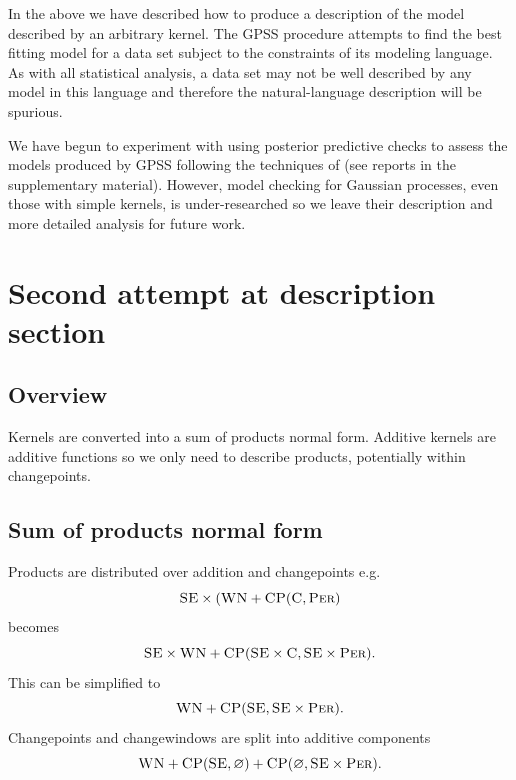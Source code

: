 \documentclass{article}
\def\eg{e.g.\ }
\let\emptyset\varnothing
\begin{document}
In the above we have described how to produce a description of the \gp{} model described by an arbitrary kernel.
The GPSS procedure attempts to find the best fitting model for a data set subject to the constraints of its modeling language.
As with all statistical analysis, a data set may not be well described by any model in this language and therefore the natural-language description will be spurious.


We have begun to experiment with using posterior predictive checks to assess the models produced by GPSS following the techniques of \cite{Gelman1996} (see reports in the supplementary material).
However, model checking for Gaussian processes, even those with simple kernels, is under-researched so we leave their description and more detailed analysis for future work.




\section{Second attempt at description section}

\subsection{Overview}

Kernels are converted into a sum of products normal form.
Additive kernels are additive functions so we only need to describe products, potentially within changepoints.


\subsection{Sum of products normal form}

Products are distributed over addition and changepoints \eg
\begin{equation}
{\textsc{SE}} \times ({\textsc{WN}} + {\textsc{CP}}({\textsc{C}}, {\textsc{Per}})
\end{equation}
becomes
\begin{equation}
{\textsc{SE}} \times {\textsc{WN}} + {\textsc{CP}}({\textsc{SE}} \times {\textsc{C}}, {\textsc{SE}} \times {\textsc{Per}}).
\end{equation}
This can be simplified to
\begin{equation}
{\textsc{WN}} + {\textsc{CP}}({\textsc{SE}}, {\textsc{SE}} \times {\textsc{Per}}).
\end{equation}
Changepoints and changewindows are split into additive components
\begin{equation}
\kWN + \kCP(\kSE, \emptyset) + \kCP(\emptyset, \kSE \times \kPer).
\end{equation}
\end{document}
